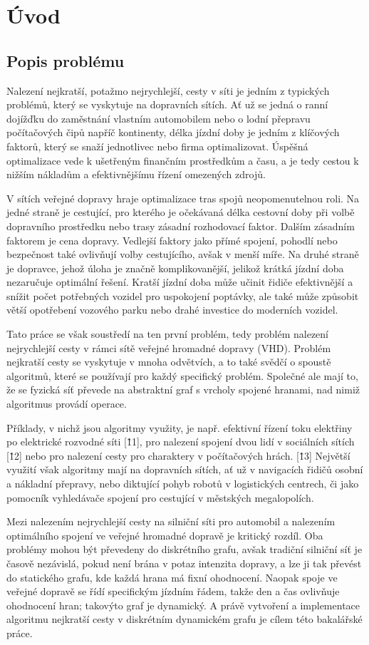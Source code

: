 
\chapter{Úvod}

\section{Popis problému}
Nalezení nejkratší, potažmo nejrychlejší, cesty v síti je jedním z typických problémů, který se vyskytuje na dopravních sítích. Ať už se jedná o ranní dojížďku do zaměstnání vlastním automobilem nebo o lodní přepravu počítačových čipů napříč kontinenty, délka jízdní doby je jedním z klíčových faktorů, který se snaží jednotlivec nebo firma optimalizovat. Úspěšná optimalizace vede k ušetřeným finančním prostředkům a času, a je tedy cestou k nižším nákladům a efektivnějšímu řízení omezených zdrojů. 

V sítích veřejné dopravy hraje optimalizace tras spojů neopomenutelnou roli. Na jedné straně je cestující, pro kterého je očekávaná délka cestovní doby při volbě dopravního prostředku nebo trasy zásadní rozhodovací faktor. Dalším zásadním faktorem je cena dopravy. Vedlejší faktory jako přímé spojení, pohodlí nebo bezpečnost také ovlivňují volby cestujícího, avšak v menší míře. Na druhé straně je dopravce, jehož úloha je značně komplikovanější, jelikož krátká jízdní doba nezaručuje optimální řešení. Kratší jízdní doba může učinit řidiče efektivnější a snížit počet potřebných vozidel pro uspokojení poptávky, ale také může způsobit větší opotřebení vozového parku nebo drahé investice do moderních vozidel. 

Tato práce se však soustředí na ten první problém, tedy problém nalezení nejrychlejší cesty v rámci sítě veřejné hromadné dopravy (VHD). Problém nejkratší cesty se vyskytuje v mnoha odvětvích, a to také svědčí o spoustě algoritmů, které se používají pro každý specifický problém. Společné ale mají to, že se fyzická síť převede na abstraktní graf s vrcholy spojené hranami, nad nimiž algoritmus provádí operace.

Příklady, v nichž jsou algoritmy využity, je např. efektivní řízení toku elektřiny po elektrické rozvodné síti [\^11], pro nalezení spojení dvou lidí v sociálních sítích [\^12] nebo pro nalezení cesty pro charaktery v počítačových hrách. [\^13] Největší využití však algoritmy mají na dopravních sítích, ať už v navigacích řidičů osobní a nákladní přepravy, nebo diktující pohyb robotů v logistických centrech,  či jako pomocník vyhledávače spojení pro cestující v městských megalopolích. 

Mezi nalezením nejrychlejší cesty na silniční síti pro automobil a nalezením optimálního spojení ve veřejné hromadné dopravě je kritický rozdíl. Oba problémy mohou být převedeny do diskrétního grafu, avšak tradiční silniční síť je časově nezávislá, pokud není brána v potaz intenzita dopravy, a lze ji tak převést do statického grafu, kde každá hrana má fixní ohodnocení. Naopak spoje ve veřejné dopravě se řídí specifickým jízdním řádem, takže den a čas ovlivňuje ohodnocení hran; takovýto graf je dynamický. A právě vytvoření a implementace algoritmu nejkratší cesty v diskrétním dynamickém grafu je cílem této bakalářské práce.